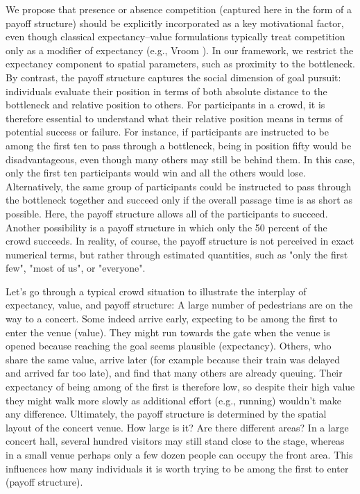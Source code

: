 \documentclass[pdflatex,sn-mathphys-num]{sn-jnl}%
\theoremstyle{thmstyleone}%
\theoremstyle{thmstyletwo}%
\theoremstyle{thmstylethree}%
\begin{document}
We propose that presence or absence competition (captured here in the form of a payoff structure) should be explicitly incorporated as a key motivational factor, even though classical expectancy–value formulations typically treat competition only as a modifier of expectancy (e.g., Vroom \cite{vroom_work_1964}). In our framework, we restrict the expectancy component to spatial parameters, such as proximity to the bottleneck. By contrast, the payoff structure captures the social dimension of goal pursuit: individuals evaluate their position in terms of both absolute distance to the bottleneck and relative position to others. For participants in a crowd, it is therefore essential to understand what their relative position means in terms of potential success or failure. For instance, if participants are instructed to be among the first ten to pass through a bottleneck, being in position fifty would be disadvantageous, even though many others may still be behind them. In this case, only the first ten participants would win and all the others would lose. Alternatively, the same group of participants could be instructed to pass through the bottleneck together and succeed only if the overall passage time is as  short as possible. Here, the payoff structure allows all of the participants to succeed. Another possibility is a payoff structure in which only the 50 percent of the crowd succeeds. In reality, of course, the payoff structure is not perceived in exact numerical terms, but rather through estimated quantities, such as "only the first few", "most of us", or "everyone".  


Let's go through a typical crowd situation to illustrate the interplay of expectancy, value, and payoff structure: A large number of pedestrians are on the way to a concert. Some indeed arrive early, expecting to be among the first to enter the venue (value). They might run towards the gate when the venue is opened because reaching the goal seems plausible (expectancy). Others, who share the same value, arrive later (for example because their train was delayed and arrived far too late), and find that many others are already queuing. Their expectancy of being among of the first is therefore low, so despite their high value they might walk more slowly as additional effort (e.g., running) wouldn't make any difference. Ultimately, the payoff structure is determined by the spatial layout of the concert venue. How large is it? Are there different areas? In a large concert hall, several hundred visitors may still stand close to the stage, whereas in a small venue perhaps only a few dozen people can occupy the front area. This influences how many individuals it is worth trying to be among the first to enter (payoff structure).
\end{document}
